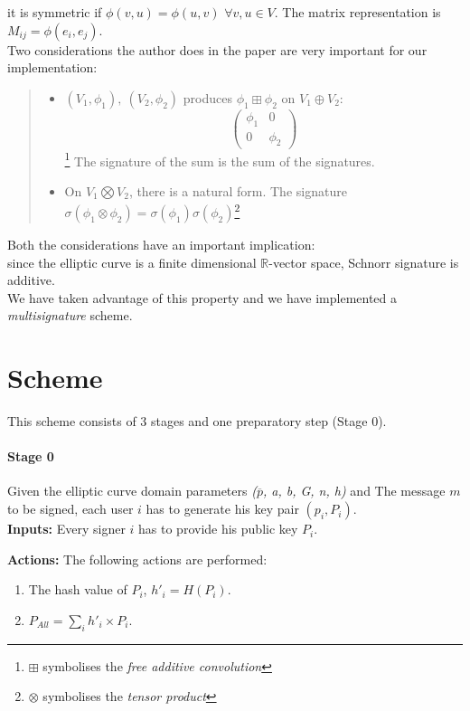 it is symmetric if $\phi(v,u)=\phi(u,v)$ $\forall v,u \in V$. The matrix representation is $M_{ij}=\phi (e_{i},e_{j})$.\\
Two considerations the author does in the paper are very important for our implementation:
\begin{quote}
	\begin{itemize}
		\item $(V_{1},\phi_{1}),\ (V_{2},\phi_{2})$ produces $\phi_{1} \boxplus \phi_{2}$ on $ V_{1}\oplus V_{2}$:
		\[ 
		\begin{pmatrix}
			 \phi _{1}  & 0\\
			0 &  \phi_{2} 
		\end{pmatrix} 
		\] \footnote{$\boxplus$ symbolises the \textit{free additive convolution}}
		The signature of the sum is the sum of the signatures.
		\item On $V_{1} \bigotimes V_{2}$, there is a natural form. The signature $\sigma(\phi_{1}\otimes \phi_{2})= \sigma(\phi_{1}) \sigma(\phi_{2})$\footnote{$\otimes$ symbolises the \textit{tensor product}}
	\end{itemize}
\end{quote}

Both the considerations have an important implication:\\
since the elliptic curve is a finite dimensional $\mathbb{R}$-vector space, Schnorr signature is additive.\\
We have taken advantage of this property and we have implemented a \textit{multisignature} scheme.

\section{Scheme}
This scheme consists of 3 stages and one preparatory step (Stage 0).
\paragraph{Stage 0} 
Given the elliptic curve domain parameters \textit{($\overline{p}$, a, b, G, n, h)} and The message $m$ to be signed, each user $i$ has to generate his key pair $(p_{i},P_{i})$.\\

\textbf{Inputs:} Every signer $i$ has to provide his public key $P_{i}$.

\textbf{Actions:} The following actions are performed:

\hspace{1.2cm}
\begin{minipage}[l]{2\linewidth}
	\begin{enumerate}
		\item The hash value of $P_{i}$, $h'_{i}=H(P_{i})$.
		\item $P_{All}=\sum_{i} h'_{i}\times P_{i}.$
	\end{enumerate}
\end{minipage}

